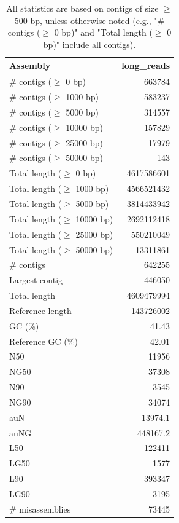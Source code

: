 \documentclass[12pt,a4paper]{article}
\begin{document}
\begin{table}[ht]
\begin{center}
\caption{All statistics are based on contigs of size $\geq$ 500 bp, unless otherwise noted (e.g., "\# contigs ($\geq$ 0 bp)" and "Total length ($\geq$ 0 bp)" include all contigs).}
\begin{tabular}{|l*{1}{|r}|}
\hline
Assembly & long\_reads \\ \hline
\# contigs ($\geq$ 0 bp) & 663784 \\ \hline
\# contigs ($\geq$ 1000 bp) & 583237 \\ \hline
\# contigs ($\geq$ 5000 bp) & 314557 \\ \hline
\# contigs ($\geq$ 10000 bp) & 157829 \\ \hline
\# contigs ($\geq$ 25000 bp) & 17979 \\ \hline
\# contigs ($\geq$ 50000 bp) & 143 \\ \hline
Total length ($\geq$ 0 bp) & 4617586601 \\ \hline
Total length ($\geq$ 1000 bp) & 4566521432 \\ \hline
Total length ($\geq$ 5000 bp) & 3814433942 \\ \hline
Total length ($\geq$ 10000 bp) & 2692112418 \\ \hline
Total length ($\geq$ 25000 bp) & 550210049 \\ \hline
Total length ($\geq$ 50000 bp) & 13311861 \\ \hline
\# contigs & 642255 \\ \hline
Largest contig & 446050 \\ \hline
Total length & 4609479994 \\ \hline
Reference length & 143726002 \\ \hline
GC (\%) & 41.43 \\ \hline
Reference GC (\%) & 42.01 \\ \hline
N50 & 11956 \\ \hline
NG50 & 37308 \\ \hline
N90 & 3545 \\ \hline
NG90 & 34074 \\ \hline
auN & 13974.1 \\ \hline
auNG & 448167.2 \\ \hline
L50 & 122411 \\ \hline
LG50 & 1577 \\ \hline
L90 & 393347 \\ \hline
LG90 & 3195 \\ \hline
\# misassemblies & 73445 \\ \hline

\end{tabular}
\end{center}
\end{table}
\end{document}
